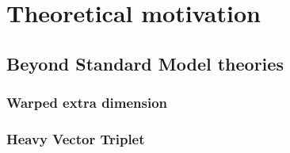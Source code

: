 \chapter{Theoretical motivation}

\section{Beyond Standard Model theories}
\subsection{Warped extra dimension}
\subsection{Heavy Vector Triplet}

\clearpage

